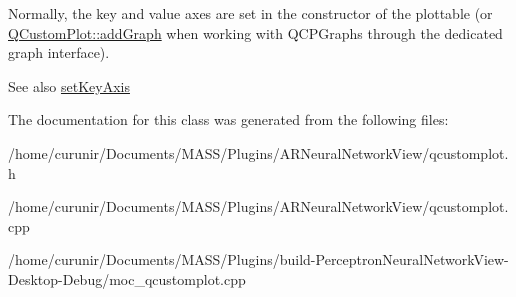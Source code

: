 Normally, the key and value axes are set in the constructor of the plottable (or \hyperlink{class_q_custom_plot_a6fb2873d35a8a8089842d81a70a54167}{Q\+Custom\+Plot\+::add\+Graph} when working with Q\+C\+P\+Graphs through the dedicated graph interface).

\begin{DoxySeeAlso}{See also}
\hyperlink{class_q_c_p_abstract_plottable_a8524fa2994c63c0913ebd9bb2ffa3920}{set\+Key\+Axis} 
\end{DoxySeeAlso}


The documentation for this class was generated from the following files\+:\begin{DoxyCompactItemize}
\item 
/home/curunir/\+Documents/\+M\+A\+S\+S/\+Plugins/\+A\+R\+Neural\+Network\+View/qcustomplot.\+h\item 
/home/curunir/\+Documents/\+M\+A\+S\+S/\+Plugins/\+A\+R\+Neural\+Network\+View/qcustomplot.\+cpp\item 
/home/curunir/\+Documents/\+M\+A\+S\+S/\+Plugins/build-\/\+Perceptron\+Neural\+Network\+View-\/\+Desktop-\/\+Debug/moc\+\_\+qcustomplot.\+cpp\end{DoxyCompactItemize}
